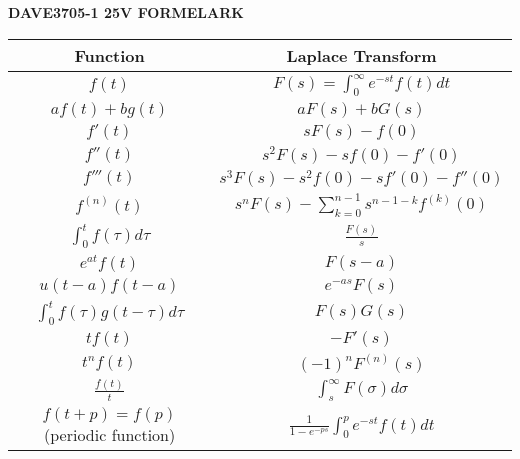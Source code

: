 \documentclass[a4paper,12pt]{article}
\begin{document}
\begin{center}
    {\Huge \textbf{DAVE3705-1 25V FORMELARK}}
\end{center}


\renewcommand{\arraystretch}{1.8}
\begin{tabular}{ |c|c| }
    \hline
    \textbf{Function} & \textbf{Laplace Transform} \\
    \hline
    $f(t)$ & $F(s) = \int_{0}^{\infty} e^{-st} f(t) dt$ \\
    \hline
    $a f(t) + b g(t)$ & $a F(s) + b G(s)$ \\
    \hline
    $f'(t)$ & $s F(s) - f(0)$ \\
    \hline
    $f''(t)$ & $s^2 F(s) - s f(0) - f'(0)$ \\
    \hline
    $f'''(t)$ & $s^3 F(s) - s^2 f(0) - s f'(0) - f''(0)$ \\
    \hline
    $f^{(n)}(t)$ & $s^n F(s) - \sum_{k=0}^{n-1} s^{n-1-k} f^{(k)}(0)$ \\
    \hline
    $\int_{0}^{t} f(\tau) d\tau$ & $\frac{F(s)}{s}$ \\
    \hline
    $e^{at} f(t)$ & $F(s-a)$ \\
    \hline
    $u(t-a) f(t-a)$ & $e^{-as} F(s)$ \\
    \hline
    $\int_{0}^{t} f(\tau) g(t-\tau) d\tau$ & $F(s) G(s)$ \\
    \hline
    $t f(t)$ & $-F'(s)$ \\
    \hline
    $t^n f(t)$ & $(-1)^n F^{(n)}(s)$ \\
    \hline
    $\frac{f(t)}{t}$ & $\int_{s}^{\infty} F(\sigma) d\sigma$ \\
    \hline
    $f(t+p) = f(p)$ (periodic function) & $\frac{1}{1 - e^{-ps}} \int_{0}^{p} e^{-st} f(t) dt$ \\
    \hline
\end{tabular}
\end{document}
